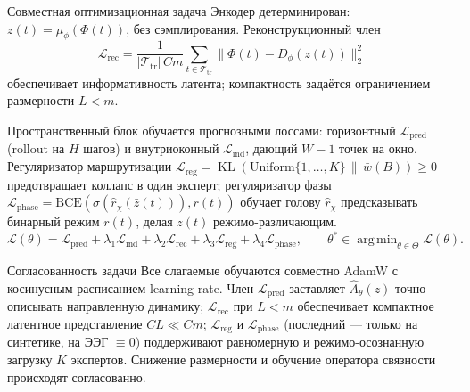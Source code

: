 \documentclass[10pt]{beamer}
\DeclareMathOperator{\KL}{KL}
\DeclareMathOperator*{\argmin}{arg\,min}
\begin{document}
\begin{frame}{Совместная оптимизационная задача}
\footnotesize
Энкодер детерминирован: $z(t)=\mu_\phi(\Phi(t))$, без сэмплирования.
Реконструкционный член
\[
\mathcal L_{\mathrm{rec}} = \frac{1}{|\mathcal T_{\mathrm{tr}}|\,Cm}
\sum_{t\in\mathcal T_{\mathrm{tr}}} \|\Phi(t) - D_\phi(z(t))\|_2^2
\]
обеспечивает информативность латента; компактность задаётся
ограничением размерности $L<m$.

Пространственный блок обучается прогнозными лоссами: горизонтный
$\mathcal L_{\mathrm{pred}}$ (rollout на $H$ шагов) и внутриоконный
$\mathcal L_{\mathrm{ind}}$, дающий $W-1$ точек на окно. Регуляризатор
маршрутизации $\mathcal L_{\mathrm{reg}} = \KL(\mathrm{Uniform}\{1,\dots,K\}
\,\|\,\bar w(B)) \ge 0$ предотвращает коллапс в один эксперт;
регуляризатор фазы $\mathcal L_{\mathrm{phase}} =
\mathrm{BCE}(\sigma(\hat r_\chi(\bar z(t))), r(t))$ обучает голову
$\hat r_\chi$ предсказывать бинарный режим $r(t)$, делая $z(t)$
режимо-различающим.
\[
\mathcal L(\theta) = \mathcal L_{\mathrm{pred}} + \lambda_1 \mathcal
L_{\mathrm{ind}} + \lambda_2 \mathcal L_{\mathrm{rec}} + \lambda_3
\mathcal L_{\mathrm{reg}} + \lambda_4 \mathcal L_{\mathrm{phase}}, \qquad
\theta^\ast \in \argmin_{\theta\in\Theta} \mathcal L(\theta).
\]

\begin{block}{Согласованность задачи}
Все слагаемые обучаются совместно AdamW с косинусным расписанием
learning rate. Член $\mathcal L_{\mathrm{pred}}$ заставляет $\hat
A_\theta(z)$ точно описывать направленную динамику; $\mathcal
L_{\mathrm{rec}}$ при $L<m$ обеспечивает компактное латентное
представление $CL \ll Cm$; $\mathcal L_{\mathrm{reg}}$ и $\mathcal
L_{\mathrm{phase}}$ (последний --- только на синтетике, на ЭЭГ
$\equiv0$) поддерживают равномерную и режимо-осознанную загрузку $K$
экспертов. Снижение размерности и обучение оператора связности
происходят согласованно.
\end{block}
\end{frame}
\end{document}

